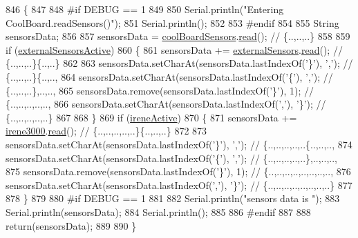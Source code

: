 \begin{DoxyCode}
846 \{
847 
848 \textcolor{preprocessor}{#if DEBUG == 1}
849 
850     Serial.println(\textcolor{stringliteral}{"Entering CoolBoard.readSensors()"});
851     Serial.println();
852 
853 \textcolor{preprocessor}{#endif}
854 
855     String sensorsData;
856 
857     sensorsData = \hyperlink{classCoolBoard_af102be5288bd7f7a8e59b13f86e26a00}{coolBoardSensors}.\hyperlink{classCoolBoardSensors_a91badb2539d91fda8679f2a597874c48}{read}(); \textcolor{comment}{// \{..,..,..\}}
858     
859     \textcolor{keywordflow}{if} (\hyperlink{classCoolBoard_a638b00b76aeb819ecfd4c10b8cdd7bb7}{externalSensorsActive})
860     \{
861         sensorsData += \hyperlink{classCoolBoard_a09e26264839c65873eb56af476eff6b2}{externalSensors}.\hyperlink{classExternalSensors_a53177b81eca3be89508b5511ddcd00fc}{read}(); \textcolor{comment}{// \{..,..,..\}\{..,..\}}
862 
863         sensorsData.setCharAt(sensorsData.lastIndexOf(\textcolor{charliteral}{'\}'}), \textcolor{charliteral}{','}); \textcolor{comment}{// \{..,..,..\}\{..,..,}
864         sensorsData.setCharAt(sensorsData.lastIndexOf(\textcolor{charliteral}{'\{'}), \textcolor{charliteral}{','}); \textcolor{comment}{// \{..,..,..\},..,..,}
865         sensorsData.remove(sensorsData.lastIndexOf(\textcolor{charliteral}{'\}'}), 1); \textcolor{comment}{// \{..,..,..,..,..,}
866         sensorsData.setCharAt(sensorsData.lastIndexOf(\textcolor{charliteral}{','}), \textcolor{charliteral}{'\}'}); \textcolor{comment}{// \{..,..,..,..,..\}}
867 
868     \}
869     \textcolor{keywordflow}{if} (\hyperlink{classCoolBoard_a9c3f7ac625481ee2ae802a25d97a4ae0}{ireneActive})
870     \{
871         sensorsData += \hyperlink{classCoolBoard_ad103718ce316006c4695b8eb312eaf11}{irene3000}.\hyperlink{classIrene3000_a852a170feea994ea1df01c6b245b5d9a}{read}(); \textcolor{comment}{// \{..,..,..,..,..\}\{..,..,..\}}
872 
873         sensorsData.setCharAt(sensorsData.lastIndexOf(\textcolor{charliteral}{'\}'}), \textcolor{charliteral}{','}); \textcolor{comment}{// \{..,..,..,..,..\{..,..,..,}
874         sensorsData.setCharAt(sensorsData.lastIndexOf(\textcolor{charliteral}{'\{'}), \textcolor{charliteral}{','}); \textcolor{comment}{// \{..,..,..,..,..\},..,..,..,}
875         sensorsData.remove(sensorsData.lastIndexOf(\textcolor{charliteral}{'\}'}), 1); \textcolor{comment}{// \{..,..,..,..,..,..,..,..,}
876         sensorsData.setCharAt(sensorsData.lastIndexOf(\textcolor{charliteral}{','}), \textcolor{charliteral}{'\}'}); \textcolor{comment}{// \{..,..,..,..,..,..,..,..\}}
877         
878     \}
879     
880 \textcolor{preprocessor}{#if DEBUG == 1}
881 
882     Serial.println(\textcolor{stringliteral}{"sensors data is "});
883     Serial.println(sensorsData);
884     Serial.println();
885 
886 \textcolor{preprocessor}{#endif}
887 
888     \textcolor{keywordflow}{return}(sensorsData);
889 
890 \}
\end{DoxyCode}
